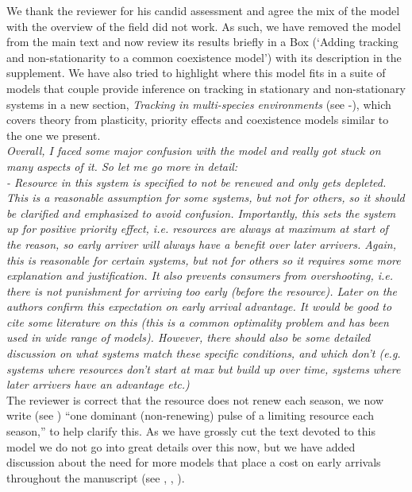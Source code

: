 \documentclass[11pt]{article}
\begin{document}
We thank the reviewer for his candid assessment and agree the mix of the model with the overview of the field did not work. As such, we have removed the model from the main text and now review its results briefly in a Box (`Adding tracking and non-stationarity to a common coexistence model') with its description in the supplement. We have also tried to highlight where this model fits in a suite of models that couple provide inference on tracking in stationary and non-stationary systems in a new section, \emph{Tracking in multi-species environments} (see -), which covers theory from plasticity, priority effects and coexistence models similar to the one we present.  \\


\emph{Overall, I faced some major confusion with the model and really got stuck on many aspects of
it. So let me go more in detail:\\
-       Resource in this system is specified to not be renewed and only gets depleted. This
is a reasonable assumption for some systems, but not for others, so it should be clarified
and emphasized to avoid confusion. Importantly, this sets the system up for positive priority
effect, i.e. resources are always at maximum at start of the reason, so early arriver will
always have a benefit over later arrivers. Again, this is reasonable for certain systems, but
not for others so it requires some more explanation and justification. It also prevents
consumers from overshooting, i.e. there is not punishment for arriving too early (before the
resource). Later on the authors confirm this expectation on early arrival advantage. It would
be good to cite some literature on this (this is a common optimality problem and has been
used in wide range of models). However, there should also be some detailed discussion on what
systems match these specific conditions, and which don’t (e.g. systems where resources don’t
start at max but build up over time, systems where later arrivers have an advantage etc.)}\\

The reviewer is correct that the resource does not renew each season, we now write (see ) ``one dominant (non-renewing) pulse of a limiting resource each season,'' to help clarify this. As we have grossly cut the text devoted to this model we do not go into great details over this now, but we have added discussion about the need for more models that place a cost on early arrivals throughout the manuscript (see , , ). \\
\end{document}
